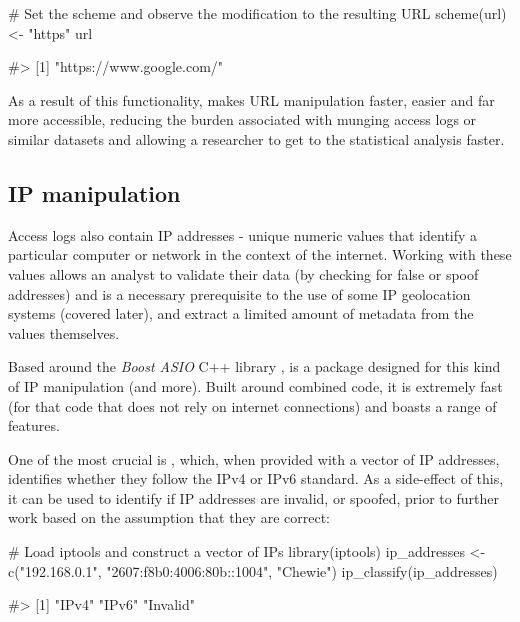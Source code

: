\begin{Schunk}
\begin{Sinput}
# Set the scheme and observe the modification to the resulting URL
scheme(url) <- "https"
url
\end{Sinput}
\begin{Soutput}
#> [1] "https://www.google.com/"
\end{Soutput}
\end{Schunk}

As a result of this functionality,  makes URL manipulation
faster, easier and far more accessible, reducing the burden associated
with munging access logs or similar datasets and allowing a researcher
to get to the statistical analysis faster.

\subsection{IP manipulation}\label{ip-manipulation}

Access logs also contain IP addresses - unique numeric values that
identify a particular computer or network in the context of the
internet. Working with these values allows an analyst to validate their
data (by checking for false or spoof addresses) and is a necessary
prerequisite to the use of some IP geolocation systems (covered later),
and extract a limited amount of metadata from the values themselves.

Based around the \emph{Boost ASIO} C++ library \citep{boostcite},
 is a package designed for this kind of IP manipulation
(and more). Built around combined code, it is extremely fast (for that
code that does not rely on internet connections) and boasts a range of
features.

One of the most crucial is , which, when provided
with a vector of IP addresses, identifies whether they follow the IPv4
or IPv6 standard. As a side-effect of this, it can be used to identify
if IP addresses are invalid, or spoofed, prior to further work based on
the assumption that they are correct:

\begin{Schunk}
\begin{Sinput}
# Load iptools and construct a vector of IPs
library(iptools)
ip_addresses <- c("192.168.0.1", "2607:f8b0:4006:80b::1004", "Chewie")
ip_classify(ip_addresses)
\end{Sinput}
\begin{Soutput}
#> [1] "IPv4"    "IPv6"    "Invalid"
\end{Soutput}
\end{Schunk}

